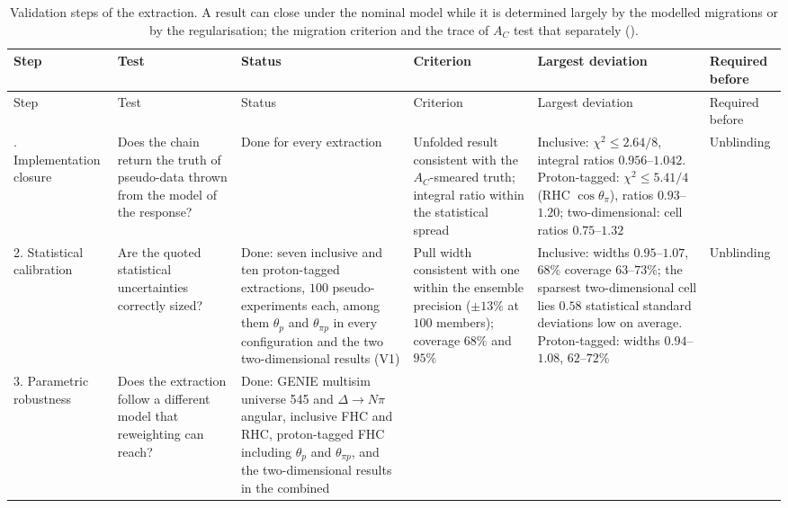 {\footnotesize\setlength{\tabcolsep}{4pt}
\begin{longtable}{@{}p{1.9cm}p{2.7cm}p{2.6cm}p{2.7cm}p{2.9cm}p{1.6cm}@{}}
\caption{Validation steps of the extraction. A result can close under the nominal model while it is
  determined largely by the modelled migrations or by the regularisation; the migration criterion and the
  trace of $A_C$ test that separately ().}
\label{tab:validation_ladder}\\
\toprule
Step & Test & Status & Criterion & Largest deviation & Required before \\
\midrule
\endfirsthead
\toprule
Step & Test & Status & Criterion & Largest deviation & Required before \\
\midrule
\endhead
\bottomrule
\endfoot
1. Implementation closure & Does the chain return the truth of pseudo-data thrown from the model of the
  response? & Done for every extraction &
  Unfolded result consistent with the $A_C$-smeared truth; integral ratio within the statistical spread &
  Inclusive: $\chi^2\le2.64/8$, integral ratios $0.956$--$1.042$. Proton-tagged: $\chi^2\le5.41/4$ (RHC
  $\cos\theta_\pi$), ratios $0.93$--$1.20$; two-dimensional: cell ratios $0.75$--$1.32$ & Unblinding \\
2. Statistical calibration & Are the quoted statistical uncertainties correctly sized? &
  Done: seven inclusive and ten proton-tagged extractions, $100$ pseudo-experiments each, among them
  $\theta_p$ and $\theta_{\pi p}$ in every configuration and the two two-dimensional results (V1) &
  Pull width consistent with one within the ensemble precision ($\pm13\%$ at $100$ members); coverage
  $68\%$ and $95\%$ &
  Inclusive: widths $0.95$--$1.07$, $68\%$ coverage $63$--$73\%$; the sparsest two-dimensional cell
  lies $0.58$ statistical standard deviations low on average. Proton-tagged: widths $0.94$--$1.08$,
  $62$--$72\%$ & Unblinding \\
3. Parametric robustness & Does the extraction follow a different model that reweighting can reach? &
  Done: GENIE multisim universe 545 and $\Delta\to N\pi$ angular, inclusive FHC and RHC, proton-tagged FHC
  including $\theta_p$ and $\theta_{\pi p}$, and the two-dimensional results in the combined

\end{longtable}}
